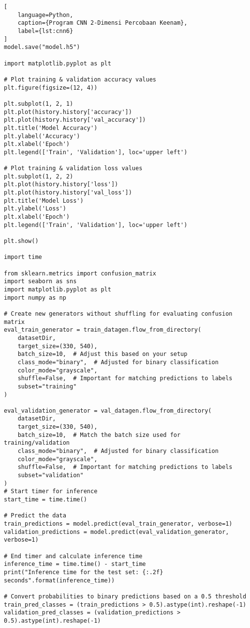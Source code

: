 \begin{lstlisting}[
    language=Python,
    caption={Program CNN 2-Dimensi Percobaan Keenam},
    label={lst:cnn6}
]
model.save("model.h5")

import matplotlib.pyplot as plt

# Plot training & validation accuracy values
plt.figure(figsize=(12, 4))

plt.subplot(1, 2, 1)
plt.plot(history.history['accuracy'])
plt.plot(history.history['val_accuracy'])
plt.title('Model Accuracy')
plt.ylabel('Accuracy')
plt.xlabel('Epoch')
plt.legend(['Train', 'Validation'], loc='upper left')

# Plot training & validation loss values
plt.subplot(1, 2, 2)
plt.plot(history.history['loss'])
plt.plot(history.history['val_loss'])
plt.title('Model Loss')
plt.ylabel('Loss')
plt.xlabel('Epoch')
plt.legend(['Train', 'Validation'], loc='upper left')

plt.show()

import time

from sklearn.metrics import confusion_matrix
import seaborn as sns
import matplotlib.pyplot as plt
import numpy as np

# Create new generators without shuffling for evaluating confusion matrix
eval_train_generator = train_datagen.flow_from_directory(
    datasetDir,
    target_size=(330, 540),
    batch_size=10,  # Adjust this based on your setup
    class_mode="binary",  # Adjusted for binary classification
    color_mode="grayscale",
    shuffle=False,  # Important for matching predictions to labels
    subset="training"
)

eval_validation_generator = val_datagen.flow_from_directory(
    datasetDir,
    target_size=(330, 540),
    batch_size=10,  # Match the batch size used for training/validation
    class_mode="binary",  # Adjusted for binary classification
    color_mode="grayscale",
    shuffle=False,  # Important for matching predictions to labels
    subset="validation"
)
# Start timer for inference
start_time = time.time()

# Predict the data
train_predictions = model.predict(eval_train_generator, verbose=1)
validation_predictions = model.predict(eval_validation_generator, verbose=1)

# End timer and calculate inference time
inference_time = time.time() - start_time
print("Inference time for the test set: {:.2f} seconds".format(inference_time))

# Convert probabilities to binary predictions based on a 0.5 threshold
train_pred_classes = (train_predictions > 0.5).astype(int).reshape(-1)
validation_pred_classes = (validation_predictions > 0.5).astype(int).reshape(-1)


\end{lstlisting}
